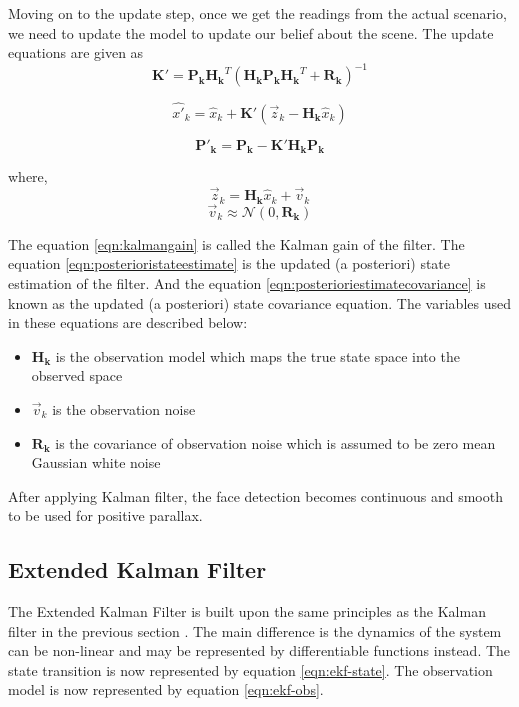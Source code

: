 \documentclass[12pt,twocolumn,letterpaper]{article}
\begin{document}
Moving on to the update step, once we get the readings from the actual scenario, we need to update the model to update our belief about the scene. The update equations are given as
\begin{equation}
\label{eqn:kalmangain}
\mathbf{K'} = \mathbf{P_k} \mathbf{H_k}^T \left( \mathbf{H_k} \mathbf{P_k} \mathbf{H_k}^T + \mathbf{R_k} \right)^{-1}
\end{equation}

\begin{equation}
\hat{x'}_k = \hat{x}_k + \mathbf{K'} \left( \vec{z}_k - \mathbf{H_k} \hat{x}_k \right)
\label{eqn:posterioristateestimate}
\end{equation}

\begin{equation}
\mathbf{P'_k} = \mathbf{P_k} - \mathbf{K'}  \mathbf{H_k} \mathbf{P_k}
\label{eqn:posterioriestimatecovariance}
\end{equation}

where,
$$ \vec{z}_k = \mathbf{H_k} \hat{x}_k + \vec{v}_k$$
$$ \vec{v}_k \approx \mathcal{N}(0, \mathbf{R_k})$$

The equation \ref{eqn:kalmangain} is called the Kalman gain of the filter. The equation \ref{eqn:posterioristateestimate} is the updated (a posteriori) state estimation of the filter. And the equation \ref{eqn:posterioriestimatecovariance} is known as the updated (a posteriori) state covariance equation. The variables used in these equations are described below:

\begin{itemize}
\item $\mathbf{H_k}$ is the observation model which maps the true state space into the observed space
\item $\vec{v}_k$ is the observation noise
\item $\mathbf{R_k}$ is the covariance of observation noise which is assumed to be zero mean Gaussian white noise
\end{itemize}

After applying Kalman filter, the face detection becomes continuous and smooth to be used for positive parallax.
\subsection{Extended Kalman Filter}
The Extended Kalman Filter is built upon the same principles as the Kalman filter in the previous section \cite{Maria}.  The main difference is the dynamics of the system can be non-linear and may be represented by differentiable functions instead.  The state transition is now represented by equation \ref{eqn:ekf-state}.  The observation model is now represented by equation \ref{eqn:ekf-obs}.
\end{document}
